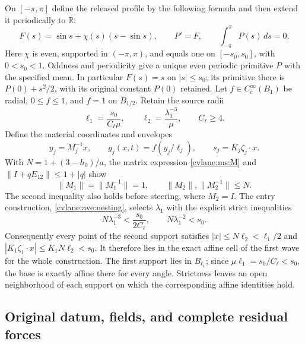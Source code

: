 On $[-\pi,\pi]$ define the released profile by the following formula
and then extend it periodically to $\mathbb R$:
\[
 F(s)=\sin s+\chi(s)(s-\sin s),\qquad
 P'=F,\qquad\int_{-\pi}^{\pi}P(s)\,ds=0.
\]
Here $\chi$ is even, supported in $(-\pi,\pi)$, and equals one
on $[-s_0,s_0]$, with $0<s_0<1$. Oddness and periodicity give
a unique even periodic primitive $P$ with the specified mean.
In particular $F(s)=s$ on $|s|\leq s_0$; its primitive there is
$P(0)+s^2/2$, with its original constant $P(0)$ retained.
Let $f\in C_c^\infty(B_1)$ be radial, $0\leq f\leq1$,
and $f=1$ on $B_{1/2}$. Retain the source radii
\[
 \ell_1=\frac{s_0}{C_\ell\mu},\qquad
 \ell_2=\frac{\lambda_1^{-3}}\mu,\qquad C_\ell\geq4.
\]
Define the material coordinates and envelopes
\[
 y_j=M_j^{-1}x,\qquad g_j(x,t)=f(y_j/\ell_j),\qquad
 s_j=K_j\zeta_j\cdot x.
\]
With $N=1+(3-h_0)/a$, the matrix expression \eqref{cvlane:ms:M}
and $\|I+qE_{12}\|\leq1+|q|$ show
\begin{equation}\label{cvlane:ms:N}
 \|M_1\|=\|M_1^{-1}\|=1,
 \qquad\|M_2\|,\|M_2^{-1}\|\leq N.
\end{equation}
The second inequality also holds before steering, where $M_2=I$.
The entry construction, \eqref{cvlane:ave:nesting}, selects $\lambda_1$ with the explicit strict
inequalities
\begin{equation}\label{cvlane:ms:nesting}
 N\lambda_1^{-3}<\frac{s_0}{2C_\ell},
 \qquad N\lambda_1^{-2}<s_0.
\end{equation}
Consequently every point of the second support satisfies
$|x|\leq N\ell_2<\ell_1/2$ and
$|K_1\zeta_1\cdot x|\leq K_1N\ell_2<s_0$.
It therefore lies in the exact affine cell of the first wave for
the whole construction. The first support lies in $B_{\ell_1}$;
since $\mu\ell_1=s_0/C_\ell<s_0$, the base is exactly affine
there for every angle. Strictness leaves an open neighborhood of
each support on which the corresponding affine identities hold.

\subsection{Original datum, fields, and complete residual forces}

